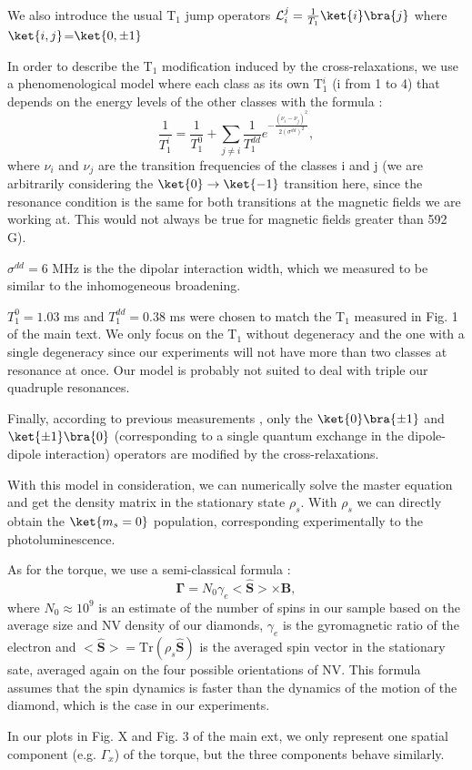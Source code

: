 \documentclass[preprintnumbers,amsmath,amssymb,onecolumn,12pt]{revtex4}
\begin{document}
We also introduce the usual T$_1$ jump operators $\mathcal{L}_i^j= \frac{1}{T_1}\ket{i}\bra{j}$ where $\ket{i,j}$=$\ket{0, \pm 1}$

In order to describe the T$_1$ modification induced by the cross-relaxations, we use a phenomenological model where each class as its own T$_1^i$ (i from 1 to 4) that depends on the energy levels of the other classes with the formula :
\begin{equation*}
\frac{1}{T_1^i}=\frac{1}{T_1^0}+\sum_{j \neq i} \frac{1}{T_1^{dd}}e^{-\frac{(\nu_i-\nu_j)^2}{2(\sigma^{dd})^2}},
\end{equation*}
where $\nu_i$ and $\nu_j$ are the transition frequencies of the classes i and j (we are arbitrarily considering the $\ket{0} \to \ket{-1}$ transition here, since the resonance condition is the same for both transitions at the magnetic fields we are working at. This would not always be true for magnetic fields greater than 592 G\citep{van_oort_cross-relaxation_1989}). 

$\sigma^{dd} = 6$ MHz is the the dipolar interaction width, which we measured to be similar to the inhomogeneous broadening.

$T_1^0=1.03$ ms and $T_1^{dd}=0.38$ ms were chosen to match the T$_1$ measured in Fig. 1 of the main text. We only focus on the T$_1$ without degeneracy and the one with a single degeneracy since our experiments will not have more than two classes at resonance at once. Our model is probably not suited to deal with triple our quadruple resonances.

Finally, according to previous measurements \citep{choi_depolarization_2017}, only the $\ket{0}\bra{\pm1}$ and $\ket{\pm1}\bra{0}$ (corresponding to a single quantum exchange in the dipole-dipole interaction) operators are modified by the cross-relaxations.

With this model in consideration, we can numerically solve the master equation and get the density matrix in the stationary state $\rho_s$. With $\rho_s$ we can directly obtain the $\ket{m_s=0}$ population, corresponding experimentally to the photoluminescence.

As for the torque, we use a semi-classical formula :
\begin{equation*}
\mathbf \Gamma = N_0 \gamma_e <\hat{\mathbf S}> \times \mathbf B,
\end{equation*}
where $N_0 \approx 10^9$ is an estimate of the number of spins in our sample based on the average size and NV density of our diamonds, $\gamma_e$ is the gyromagnetic ratio of the electron and $<\hat{\mathbf S}> =\mathrm{Tr}(\rho_s \mathbf{\hat S})$ is the averaged spin vector in the stationary sate, averaged again on the four possible orientations of NV.
This formula assumes that the spin dynamics is faster than the dynamics of the motion of the diamond, which is the case in our experiments.

In our plots in Fig. X and Fig. 3 of the main ext, we only represent one spatial component (e.g. $\Gamma_x$) of the torque, but the three components behave similarly.

\end{document}
